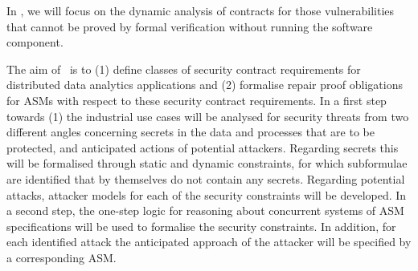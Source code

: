 \begin{Workpackage}{\thewpno}
\begin{Task}

\TaskResults{%
}
\TaskHeader{}

\end{Task}


\begin{Task}

\TaskResults{%
}
\TaskHeader{}

In \theTask, we will focus on the dynamic analysis of contracts for
those vulnerabilities that cannot be proved by formal verification
without running the software component.
\end{Task}

\begin{Task}

\TaskResults{%
}
\TaskHeader{}

The aim of \theTask\ is to (1) define classes of security contract requirements for distributed data analytics applications and (2) formalise repair proof obligations for ASMs with respect to these security contract requirements. In a first step towards (1) the industrial use cases will be analysed for security threats from two different angles concerning secrets in the data and processes that are to be protected, and anticipated actions of potential attackers. Regarding secrets this will be formalised through static and dynamic constraints, for which subformulae are identified that by themselves do not contain any secrets. Regarding potential attacks, attacker models for each of the security constraints will be developed. In a second step, the one-step logic for reasoning about concurrent systems of ASM specifications will be used to formalise the security constraints. In addition, for each identified attack the anticipated approach of the attacker will be specified by a corresponding ASM.
\end{Task}


\begin{Task}


\end{Task}
\end{Workpackage}
